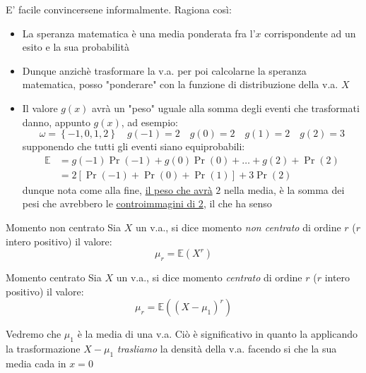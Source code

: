 E' facile convincersene informalmente. Ragiona così:
\begin{itemize}
	\item La speranza matematica è una media ponderata fra l'$ x $ corrispondente ad un esito e la sua probabilità
	\item Dunque anzichè trasformare la v.a. per poi calcolarne la speranza matematica, posso "ponderare" con la funzione di distribuzione della v.a. $ X $
	\item Il valore $ g\left(x\right) $ avrà un "peso" uguale alla somma degli eventi che trasformati danno, appunto $ g\left(x\right) $, ad esempio:
	      \[
		      \omega = \left\{-1, 0 , 1, 2\right\} \quad g\left(-1\right) = 2 \quad g\left(0\right) = 2 \quad g\left(1\right) = 2 \quad  g\left(2\right) = 3
	      \]
	      supponendo che tutti gli eventi siano equiprobabili:
	      \begin{align*}
		      \mathbb{E} & = g\left(-1\right) \Pr \left(-1\right) + g\left(0\right) \Pr \left(0\right)+ \ldots + g\left(2\right) + \Pr\left(2\right) \\
		                 & = 2 \left[\Pr \left(-1\right) + \Pr \left(0\right) + \Pr \left(1\right)\right] + 3 \Pr \left(2\right)
	      \end{align*}
	      dunque nota come alla fine, \underline{il peso che avrà} $ 2 $ nella media, è la somma dei pesi che avrebbero le \underline{controimmagini di 2}, il che ha senso
\end{itemize}
\begin{definizione}{Momento non centrato}
	Sia $ X $ un v.a., si dice momento \textit{non centrato} di ordine $ r $ ($ r $ intero positivo) il valore:
	\[
		\mu _r = \mathbb{E} \left(X^{r}\right)
	\]
\end{definizione}
\begin{definizione}{Momento centrato}
	Sia $ X $ un v.a., si dice momento \textit{centrato} di ordine $ r $ ($ r $ intero positivo) il valore:
	\[
		\mu _r = \mathbb{E} \left(\left(X - \mu_1\right)^{r}\right)
	\]
\end{definizione}
Vedremo che $ \mu_1 $ è la media di una v.a. Ciò è significativo in quanto la applicando la trasformazione $ X - \mu_1 $ \textit{trasliamo} la densità della v.a. facendo si che la sua media cada in $ x=0 $
